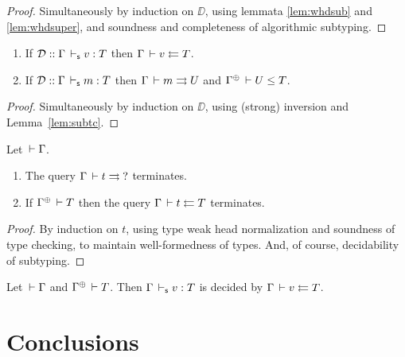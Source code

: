 \documentclass[acmlarge,review,anonymous]{acmart}\settopmatter{printfolios=true}
\begin{document}
\begin{proof}
  Simultaneously by induction on $\DD$, using %
  lemmata \ref{lem:whdsub} and \ref{lem:whdsuper},
  and soundness and completeness of algorithmic subtyping.
\end{proof}
\begin{theorem}
\bla
\begin{enumerate}
\item If $\mathcal{D} :: \Gamma \,\vdash_\mathsf{s} v : T$ then $\Gamma \,\vdash v \leftleftarrows T$.
\item If $\mathcal{D} :: \Gamma \,\vdash_\mathsf{s} m : T$ then $\Gamma \,\vdash m \rightrightarrows U$ and $\resurrect\Gamma \der U \leq T$.
\end{enumerate}
\end{theorem}
\begin{proof}
Simultaneously by induction on $\DD$, using (strong) inversion and Lemma~\ref{lem:subtc}.
\end{proof}

\begin{lemma}
  Let $\,\vdash \Gamma$.
  \begin{enumerate}
  \item The query $\Gamma \,\vdash t \rightrightarrows \mbox{?}$ terminates.
  \item If $\resurrect\Gamma \der T$ then the query $\Gamma \,\vdash t \leftleftarrows T$ terminates.
  \end{enumerate}
\end{lemma}
\begin{proof}
  By induction on $t$, using type weak head normalization and soundness of type checking, to maintain well-formedness of types.
  And, of course, decidability of subtyping.
\end{proof}

\begin{theorem}
  Let $\,\vdash \Gamma$ and $\resurrect \Gamma \der T$.
  Then $\Gamma \,\vdash_\mathsf{s} v : T$ is decided by $\Gamma \,\vdash v \leftleftarrows T$.
\end{theorem}


\section{Conclusions}
\label{sec:concl}
\end{document}
